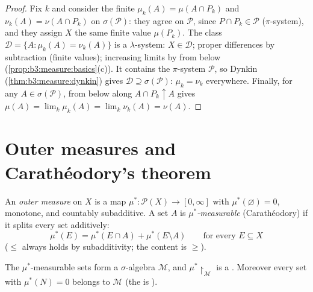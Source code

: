 \begin{proof}
Fix $k$ and consider the finite  $\mu_k(A) = \mu(A \cap
P_k)$ and $\nu_k(A) = \nu(A \cap P_k)$ on $\sigma(\mathcal
P)$: they agree on $\mathcal P$, since $P \cap P_k \in \mathcal
P$ ($\pi$-system), and they assign $X$ the same finite value
$\mu(P_k)$. The class $\mathcal D = \{A : \mu_k(A) =
\nu_k(A)\}$ is a $\lambda$-system: $X \in \mathcal D$; proper
differences by subtraction (finite values); increasing limits
by  from below (\cref{prop:b3:measure:basics}(c)).
It contains the $\pi$-system $\mathcal P$, so Dynkin
(\cref{thm:b3:measure:dynkin}) gives $\mathcal D \supseteq
\sigma(\mathcal P)$: $\mu_k = \nu_k$ everywhere. Finally, for
any $A \in \sigma(\mathcal P)$,  from below along $A
\cap P_k \uparrow A$ gives $\mu(A) = \lim_k\mu_k(A) =
\lim_k\nu_k(A) = \nu(A)$.
\end{proof}

\section{Outer measures and Carath\'eodory's theorem}

\begin{definition}\label{def:b3:measure:outer}
An \emph{outer measure} on $X$ is a map
$\mu^* \colon \mathcal P(X) \to [0, \infty]$ with
$\mu^*(\varnothing) = 0$, monotone, and countably subadditive.
A set $A$ is \emph{$\mu^*$-measurable} (Carath\'eodory) if it
splits every set additively:
\[
\mu^*(E) = \mu^*(E \cap A) + \mu^*(E \setminus A)
\qquad \text{for every } E \subseteq X
\]
($\leq$ always holds by subadditivity; the content is $\geq$).
\end{definition}

\begin{theorem}\label{thm:b3:measure:caratheodory}
The $\mu^*$-measurable sets form a $\sigma$-algebra $\mathcal
M$, and $\mu^*\restriction_{\mathcal M}$ is a .
Moreover every set with $\mu^*(N) = 0$ belongs to $\mathcal M$
(the  is \emph{}).
\end{theorem}

